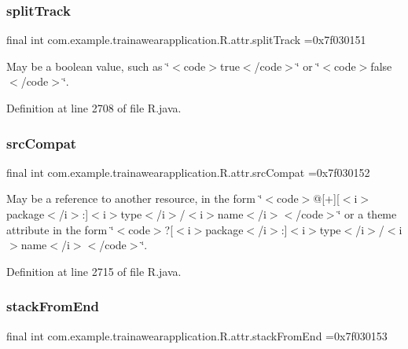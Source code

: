 \subsubsection{\texorpdfstring{splitTrack}{splitTrack}}
{\footnotesize\ttfamily final int com.\+example.\+trainawearapplication.\+R.\+attr.\+split\+Track =0x7f030151\hspace{0.3cm}{\ttfamily [static]}}

May be a boolean value, such as \char`\"{}$<$code$>$true$<$/code$>$\char`\"{} or \char`\"{}$<$code$>$false$<$/code$>$\char`\"{}. 

Definition at line 2708 of file R.\+java.

\mbox{\label{classcom_1_1example_1_1trainawearapplication_1_1_r_1_1attr_ae40e8418b31c9577214fac9b00bbf81c}} 
\subsubsection{\texorpdfstring{srcCompat}{srcCompat}}
{\footnotesize\ttfamily final int com.\+example.\+trainawearapplication.\+R.\+attr.\+src\+Compat =0x7f030152\hspace{0.3cm}{\ttfamily [static]}}

May be a reference to another resource, in the form \char`\"{}$<$code$>$@\mbox{[}+\mbox{]}\mbox{[}$<$i$>$package$<$/i$>$\+:\mbox{]}$<$i$>$type$<$/i$>$/$<$i$>$name$<$/i$>$$<$/code$>$\char`\"{} or a theme attribute in the form \char`\"{}$<$code$>$?\mbox{[}$<$i$>$package$<$/i$>$\+:\mbox{]}$<$i$>$type$<$/i$>$/$<$i$>$name$<$/i$>$$<$/code$>$\char`\"{}. 

Definition at line 2715 of file R.\+java.

\mbox{\label{classcom_1_1example_1_1trainawearapplication_1_1_r_1_1attr_aa7e988dc74000a8a618215e1f37ccf16}} 
\subsubsection{\texorpdfstring{stackFromEnd}{stackFromEnd}}
{\footnotesize\ttfamily final int com.\+example.\+trainawearapplication.\+R.\+attr.\+stack\+From\+End =0x7f030153\hspace{0.3cm}{\ttfamily [static]}}

